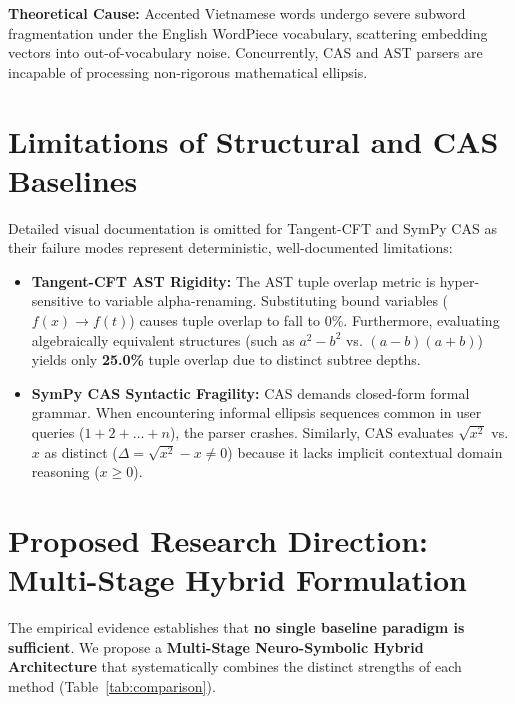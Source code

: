 \documentclass[11pt,a4paper]{article}
\begin{document}
	\noindent \textbf{Theoretical Cause:} Accented Vietnamese words undergo severe subword fragmentation under the English WordPiece vocabulary, scattering embedding vectors into out-of-vocabulary noise. Concurrently, CAS and AST parsers are incapable of processing non-rigorous mathematical ellipsis.

	\section{Limitations of Structural and CAS Baselines}
	Detailed visual documentation is omitted for Tangent-CFT and SymPy CAS as their failure modes represent deterministic, well-documented limitations:
	
	\begin{itemize}
		\item \textbf{Tangent-CFT AST Rigidity:} The AST tuple overlap metric is hyper-sensitive to variable alpha-renaming. Substituting bound variables ($f(x) \to f(t)$) causes tuple overlap to fall to 0\%. Furthermore, evaluating algebraically equivalent structures (such as $a^2 - b^2$ vs. $(a-b)(a+b)$) yields only \textbf{25.0\%} tuple overlap due to distinct subtree depths.
		\item \textbf{SymPy CAS Syntactic Fragility:} CAS demands closed-form formal grammar. When encountering informal ellipsis sequences common in user queries ($1 + 2 + \dots + n$), the parser crashes. Similarly, CAS evaluates $\sqrt{x^2}$ vs. $x$ as distinct ($\Delta = \sqrt{x^2} - x \neq 0$) because it lacks implicit contextual domain reasoning ($x \ge 0$).
	\end{itemize}

	\section{Proposed Research Direction: Multi-Stage Hybrid Formulation}
	The empirical evidence establishes that \textbf{no single baseline paradigm is sufficient}. We propose a \textbf{Multi-Stage Neuro-Symbolic Hybrid Architecture} that systematically combines the distinct strengths of each method (Table~\ref{tab:comparison}).
\end{document}
